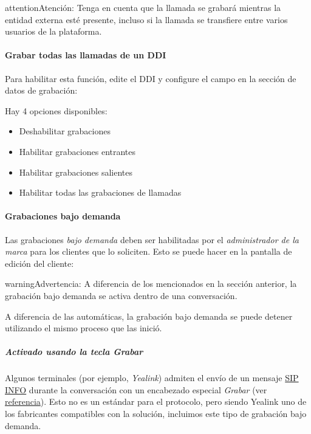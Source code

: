 \documentclass[letterpaper,10pt,spanish]{sphinxmanual}
\begin{document}
\begin{notice}{attention}{Atención:}
Tenga en cuenta que la llamada se grabará mientras la entidad externa esté presente, incluso si la llamada se transfiere entre varios usuarios de la plataforma.
\end{notice}
\paragraph{Grabar todas las llamadas de un DDI}

Para habilitar esta función, edite el DDI y configure el campo en la sección de datos de grabación:

Hay 4 opciones disponibles:
\begin{itemize}
\item {} 
Deshabilitar grabaciones

\item {} 
Habilitar grabaciones entrantes

\item {} 
Habilitar grabaciones salientes

\item {} 
Habilitar todas las grabaciones de llamadas

\end{itemize}


\paragraph{Grabaciones bajo demanda}
\label{administration_portal/client/residential/calls/call_recordings:on-demand-recordings}
Las grabaciones \emph{bajo demanda} deben ser habilitadas por el \emph{administrador de la marca} para los clientes que lo soliciten. Esto se puede hacer en la pantalla de edición del cliente:

\begin{notice}{warning}{Advertencia:}
A diferencia de los {\hyperref[administration_portal/client/vpbx/services:services]{}} mencionados en la sección anterior, la grabación bajo demanda se activa dentro de una conversación.
\end{notice}

A diferencia de las automáticas, la grabación bajo demanda se puede detener utilizando el mismo proceso que las inició.


\subparagraph{Activado usando la tecla \emph{Grabar}}
\label{administration_portal/client/residential/calls/call_recordings:activated-using-the-record-key}
Algunos terminales (por ejemplo, \emph{Yealink}) admiten el envío de un mensaje \href{https://tools.ietf.org/html/rfc6086}{SIP INFO} durante la conversación con un encabezado especial \emph{Grabar} (ver \href{http://www.yealink.com/Upload/document/UsingCallRecordingFeatureonYealinkPhones/UsingCallRecordingFeatureonYealinkSIPT2XPphonesRev\_610-20561729764.pdf}{referencia}). Esto no es un estándar para el protocolo, pero siendo Yealink uno de los fabricantes compatibles con la solución, incluimos este tipo de grabación bajo demanda.
\end{document}
